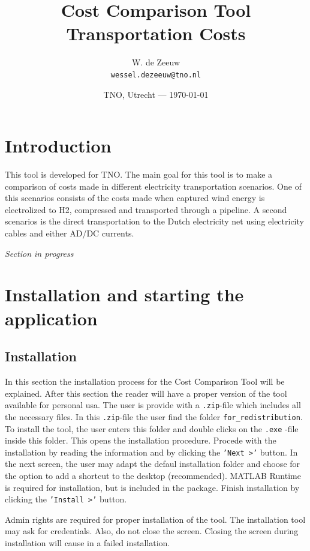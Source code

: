 \documentclass{article}
\title{Cost Comparison Tool Transportation Costs} %
\author{W. de Zeeuw\\ \texttt{wessel.dezeeuw@tno.nl}} %
\date{TNO, Utrecht --- \today} %
\begin{document}
\maketitle %


\section*{Introduction} %

	This tool is developed for TNO. The main goal for this tool is to make a
    comparison of costs made in different electricity transportation scenarios.
    One of this scenarios consists of the costs made when captured wind energy
    is electrolized to H2, compressed and transported through a pipeline. A
    second scenarios is the direct transportation to the Dutch electricity net
    using electricity cables and either AD/DC currents.

\bigskip
\textit{Section in progress} 

\section{Installation and starting the application}
\subsection{Installation}
In this section the installation process for the Cost Comparison Tool will be explained. After this section the reader will have a proper version of the tool available for personal usa. The user is provide with a \texttt{.zip}-file which includes all the necessary files. In this \texttt{.zip}-file the user find the folder \texttt{for\_redistribution}. To install the tool, the user enters this folder and double clicks on the \texttt{.exe} -file inside this folder. This opens the installation procedure. Procede with the installation by reading the information and by clicking the \texttt{'Next >'} button. In the next screen, the user may adapt the defaul installation folder and choose for the option to add a shortcut to the desktop (recommended). MATLAB Runtime is required for installation, but is included in the package. Finish installation by clicking the \texttt{'Install >'} button. 
\begin{info}
Admin rights are required for proper installation of the tool. The installation tool may ask for credentials. Also, do not close the screen. Closing the screen during installation will cause in a failed installation.
\end{info}
\end{document}
